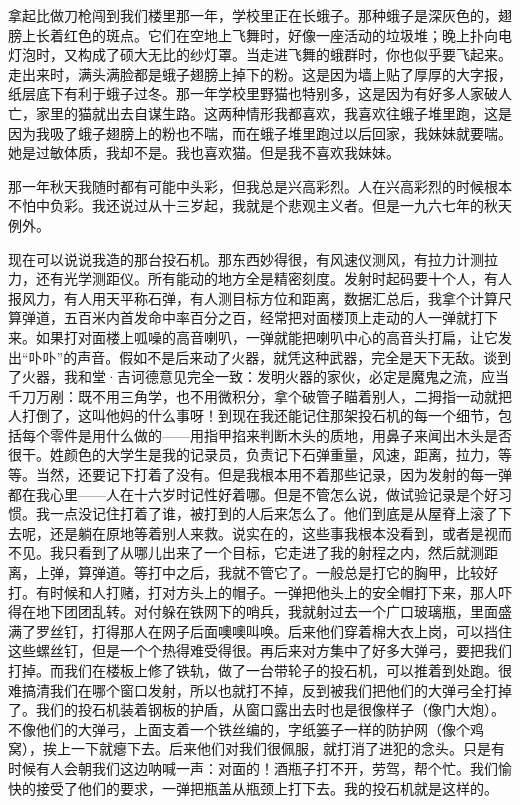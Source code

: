 拿起比做刀枪闯到我们楼里那一年，学校里正在长蛾子。那种蛾子是深灰色的，翅膀上长着红色的斑点。它们在空地上飞舞时，好像一座活动的垃圾堆；晚上扑向电灯泡时，又构成了硕大无比的纱灯罩。当走进飞舞的蛾群时，你也似乎要飞起来。走出来时，满头满脸都是蛾子翅膀上掉下的粉。这是因为墙上贴了厚厚的大字报，纸层底下有利于蛾子过冬。那一年学校里野猫也特别多，这是因为有好多人家破人亡，家里的猫就出去自谋生路。这两种情形我都喜欢，我喜欢往蛾子堆里跑，这是因为我吸了蛾子翅膀上的粉也不喘，而在蛾子堆里跑过以后回家，我妹妹就要喘。她是过敏体质，我却不是。我也喜欢猫。但是我不喜欢我妹妹。 

那一年秋天我随时都有可能中头彩，但我总是兴高彩烈。人在兴高彩烈的时候根本不怕中负彩。我还说过从十三岁起，我就是个悲观主义者。但是一九六七年的秋天例外。 

现在可以说说我造的那台投石机。那东西妙得很，有风速仪测风，有拉力计测拉力，还有光学测距仪。所有能动的地方全是精密刻度。发射时起码要十个人，有人报风力，有人用天平称石弹，有人测目标方位和距离，数据汇总后，我拿个计算尺算弹道，五百米内首发命中率百分之百，经常把对面楼顶上走动的人一弹就打下来。如果打对面楼上呱噪的高音喇叭，一弹就能把喇叭中心的高音头打扁，让它发出“卟卟”的声音。假如不是后来动了火器，就凭这种武器，完全是天下无敌。谈到了火器，我和堂·吉诃德意见完全一致：发明火器的家伙，必定是魔鬼之流，应当千刀万剐：既不用三角学，也不用微积分，拿个破管子瞄着别人，二拇指一动就把人打倒了，这叫他妈的什么事呀！到现在我还能记住那架投石机的每一个细节，包括每个零件是用什么做的——用指甲掐来判断木头的质地，用鼻子来闻出木头是否很干。姓颜色的大学生是我的记录员，负责记下石弹重量，风速，距离，拉力，等等。当然，还要记下打着了没有。但是我根本用不着那些记录，因为发射的每一弹都在我心里——人在十六岁时记性好着哪。但是不管怎么说，做试验记录是个好习惯。我一点没记住打着了谁，被打到的人后来怎么了。他们到底是从屋脊上滚了下去呢，还是躺在原地等着别人来救。说实在的，这些事我根本没看到，或者是视而不见。我只看到了从哪儿出来了一个目标，它走进了我的射程之内，然后就测距离，上弹，算弹道。等打中之后，我就不管它了。一般总是打它的胸甲，比较好打。有时候和人打赌，打对方头上的帽子。一弹把他头上的安全帽打下来，那人吓得在地下团团乱转。对付躲在铁网下的哨兵，我就射过去一个广口玻璃瓶，里面盛满了罗丝钉，打得那人在网子后面噢噢叫唤。后来他们穿着棉大衣上岗，可以挡住这些螺丝钉，但是一个个热得难受得很。再后来对方集中了好多大弹弓，要把我们打掉。而我们在楼板上修了铁轨，做了一台带轮子的投石机，可以推着到处跑。很难搞清我们在哪个窗口发射，所以也就打不掉，反到被我们把他们的大弹弓全打掉了。我们的投石机装着钢板的护盾，从窗口露出去时也是很像样子（像门大炮）。不像他们的大弹弓，上面支着一个铁丝编的，字纸篓子一样的防护网（像个鸡窝），挨上一下就瘪下去。后来他们对我们很佩服，就打消了进犯的念头。只是有时候有人会朝我们这边呐喊一声：对面的！酒瓶子打不开，劳驾，帮个忙。我们愉快的接受了他们的要求，一弹把瓶盖从瓶颈上打下去。我的投石机就是这样的。 

